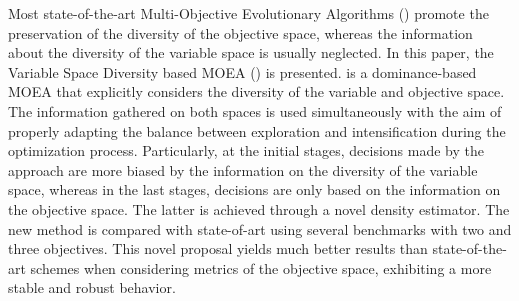 Most state-of-the-art Multi-Objective Evolutionary Algorithms (\MOEAS{}) promote the preservation of the diversity 
of the objective space, whereas the information about the diversity of the variable space is usually neglected.
%
In this paper, the Variable Space Diversity based MOEA (\VSDMOEA{}) is presented.
%
\VSDMOEA{} is a dominance-based MOEA that explicitly considers the diversity of the variable and objective space.
%
The information gathered on both spaces is used simultaneously with the aim of properly adapting the balance between exploration
and intensification during the optimization process.
%
Particularly, at the initial stages, decisions made by the approach are more biased by the information on the diversity of 
the variable space, whereas in the last stages, decisions are only based on the information on the objective space.
%
The latter is achieved through a novel density estimator.
%
The new method is compared with state-of-art \MOEAS{} using several benchmarks with two and three objectives.
%
This novel proposal yields much better results than state-of-the-art schemes when considering metrics of the objective space, 
exhibiting a more stable and robust behavior.
